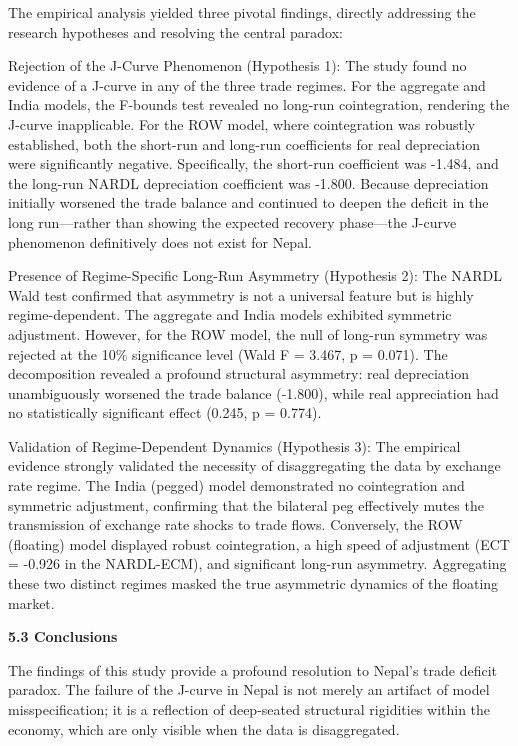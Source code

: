 \documentclass[12pt]{article}
\begin{document}
The empirical analysis yielded three pivotal findings, directly addressing the research hypotheses and resolving the central paradox:

Rejection of the J-Curve Phenomenon (Hypothesis 1): The study found no evidence of a J-curve in any of the three trade regimes. For the aggregate and India models, the F-bounds test revealed no long-run cointegration, rendering the J-curve inapplicable. For the ROW model, where cointegration was robustly established, both the short-run and long-run coefficients for real depreciation were significantly negative. Specifically, the short-run coefficient was -1.484, and the long-run NARDL depreciation coefficient was -1.800. Because depreciation initially worsened the trade balance and continued to deepen the deficit in the long run—rather than showing the expected recovery phase—the J-curve phenomenon definitively does not exist for Nepal.

Presence of Regime-Specific Long-Run Asymmetry (Hypothesis 2): The NARDL Wald test confirmed that asymmetry is not a universal feature but is highly regime-dependent. The aggregate and India models exhibited symmetric adjustment. However, for the ROW model, the null of long-run symmetry was rejected at the 10\% significance level (Wald F = 3.467, p = 0.071). The decomposition revealed a profound structural asymmetry: real depreciation unambiguously worsened the trade balance (-1.800), while real appreciation had no statistically significant effect (0.245, p = 0.774).

Validation of Regime-Dependent Dynamics (Hypothesis 3): The empirical evidence strongly validated the necessity of disaggregating the data by exchange rate regime. The India (pegged) model demonstrated no cointegration and symmetric adjustment, confirming that the bilateral peg effectively mutes the transmission of exchange rate shocks to trade flows. Conversely, the ROW (floating) model displayed robust cointegration, a high speed of adjustment (ECT = -0.926 in the NARDL-ECM), and significant long-run asymmetry. Aggregating these two distinct regimes masked the true asymmetric dynamics of the floating market.

\vspace{0.5cm}
\noindent\textbf{5.3 Conclusions}

The findings of this study provide a profound resolution to Nepal’s trade deficit paradox. The failure of the J-curve in Nepal is not merely an artifact of model misspecification; it is a reflection of deep-seated structural rigidities within the economy, which are only visible when the data is disaggregated.
\end{document}
